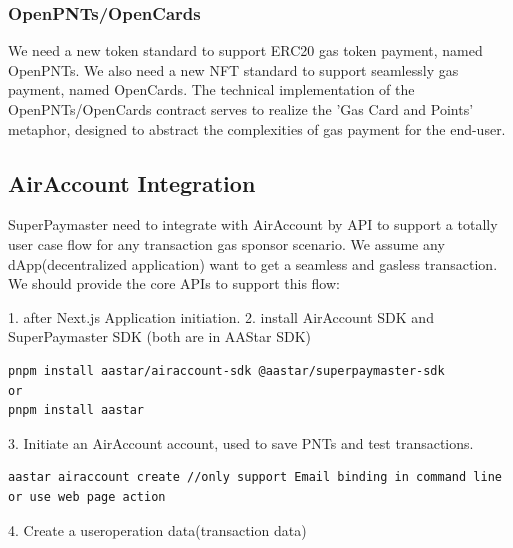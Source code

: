 \documentclass[preprint,12pt]{elsarticle}
\begin{document}
\subsubsection{OpenPNTs/OpenCards}
\label{subsubsec:openpnts-opencards}

We need a new token standard to support ERC20 gas token payment, named OpenPNTs. We also need a new NFT standard to support seamlessly gas payment, named OpenCards. The technical implementation of the OpenPNTs/OpenCards contract serves to realize the 'Gas Card and Points' metaphor, designed to abstract the complexities of gas payment for the end-user.

\subsection{AirAccount Integration}
\label{subsec:airaccount-integration}

SuperPaymaster need to integrate with AirAccount by API to support a totally user case flow for any transaction gas sponsor scenario. We assume any dApp(decentralized application) want to get a seamless and gasless transaction. We should provide the core APIs to support this flow:

1. after Next.js Application initiation.
2. install AirAccount SDK and SuperPaymaster SDK (both are in AAStar SDK)

\begin{verbatim}
pnpm install aastar/airaccount-sdk @aastar/superpaymaster-sdk
or 
pnpm install aastar
\end{verbatim}

3. Initiate an AirAccount account, used to save PNTs and test transactions.

\begin{verbatim}
aastar airaccount create //only support Email binding in command line
or use web page action
\end{verbatim}

4. Create a useroperation data(transaction data)
\end{document}
